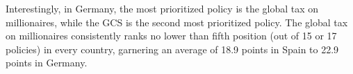 Interestingly, in Germany, the most prioritized policy is the global tax on millionaires, while the GCS is the second most prioritized policy. The global tax on millionaires consistently ranks no lower than fifth position (out of 15 or 17 policies) in every country, garnering an average of 18.9 points in Spain to 22.9 points in Germany.



  


